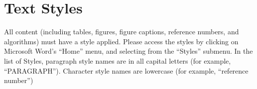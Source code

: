 \section{Text Styles}

All content (including tables, figures, figure captions, reference numbers, and algorithms) must have a style applied. Please access the styles by clicking on Microsoft Word’s “Home” menu, and selecting from the “Styles” submenu. In the list of Styles, paragraph style names are in all
capital letters (for example, “PARAGRAPH”). Character style names are lowercase (for example, “reference number”)